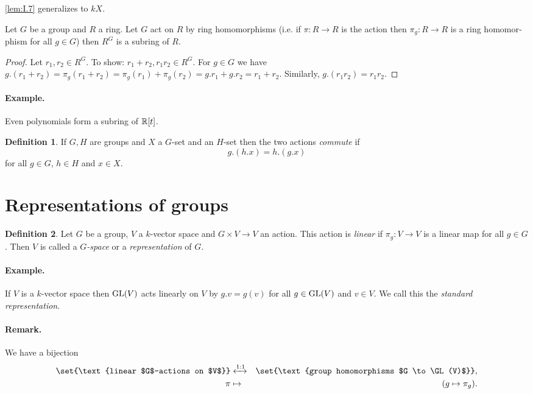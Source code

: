 \documentclass[12pt,a4paper]{scrartcl}
\theoremstyle{cplain}
\theoremstyle{cplain}
\theoremstyle{cplain}
\theoremstyle{definition}
\newtheorem*{deff}{Definition}
\begin{document}
\begin{otherlanguage}{english}
\cref{lem:I.7} generalizes to $kX$.

\begin{lem} \label{lem:I.8}
  Let $G$ be a group and $R$ a ring. Let $G$ act on $R$ by ring homomorphisms (i.e. if $\pi\colon R \to R$ is the action then $\pi_g\colon R\to R$ is a ring homomorphism for all $g\in G$) then $R^G$ is a subring of $R$.
\end{lem}
\begin{proof}
  Let $r_1,r_2 \in R^G$. To show: $r_1+r_2,r_1r_2 \in R^G$. For $g \in G$ we have $g.(r_1+r_2) = \pi_g(r_1+r_2) = \pi_g(r_1) + \pi_g(r_2) = g.r_1 + g.r_2 = r_1+r_2$. Similarly, $g.(r_1r_2) = r_1r_2$.
\end{proof}

\paragraph{Example.} Even polynomials form a subring of $\mathbb R[t]$.

\begin{deff}
  If $G,H$ are groups and $X$ a $G$-set and an $H$-set then the two actions \emph{commute} if \[g.(h.x) = h.(g.x)\] for all $g\in G$, $h\in H$ and $x \in X$.
\end{deff}


\section{Representations of groups}
\begin{deff}
  Let $G$ be a group, $V$ a $k$-vector space and $G\times V \to V$ an action. This action is \emph{linear} if $\pi_g\colon V\to V$ is a linear map for all $g\in G$. Then $V$ is called a \emph{$G$-space} or a \emph{representation} of $G$.
\end{deff}

\paragraph{Example.} If $V$ is a $k$-vector space then $\operatorname{GL}(V)$ acts linearly on $V$ by $g.v = g(v)$ for all $g \in \operatorname{GL}(V)$ and $v\in V$. We call this the \emph{standard representation}.

\paragraph{Remark.}
We have a bijection
\begin{eqnarray*}
  \set{\text{linear $G$-actions on $V$}} &\xleftrightarrow{1:1}& \set{\text{group homomorphisms $G \to \GL(V)$}}, \\
  \pi &\mapsto& (g \mapsto \pi_g).
\end{eqnarray*}


\end{otherlanguage}
\end{document}

